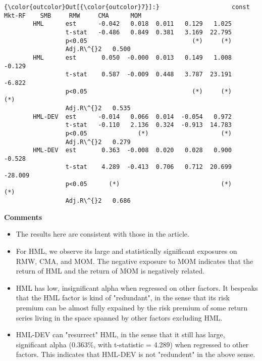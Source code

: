 \documentclass[11pt]{article}
\providecommand{\tightlist}{%
      \setlength{\itemsep}{0pt}\setlength{\parskip}{0pt}}
\begin{document}
            \begin{Verbatim}[commandchars=\\\{\}]
{\color{outcolor}Out[{\color{outcolor}7}]:}                    const  Mkt-RF    SMB     RMW     CMA      MOM
        HML      est      -0.042   0.018  0.011   0.129   1.025         
                 t-stat   -0.486   0.849  0.381   3.169  22.795         
                 p<0.05                             (*)     (*)         
                 Adj.R\^{}2   0.500                                        
        HML      est       0.050  -0.000  0.013   0.149   1.008   -0.129
                 t-stat    0.587  -0.009  0.448   3.787  23.191   -6.822
                 p<0.05                             (*)     (*)      (*)
                 Adj.R\^{}2   0.535                                        
        HML-DEV  est      -0.014   0.066  0.014  -0.054   0.972         
                 t-stat   -0.110   2.136  0.324  -0.913  14.783         
                 p<0.05              (*)                    (*)         
                 Adj.R\^{}2   0.279                                        
        HML-DEV  est       0.363  -0.008  0.020   0.028   0.900   -0.528
                 t-stat    4.289  -0.413  0.706   0.712  20.699  -28.009
                 p<0.05      (*)                            (*)      (*)
                 Adj.R\^{}2   0.686                                        
\end{Verbatim}
        
    \textbf{Comments}

\begin{itemize}
\tightlist
\item
  The results here are consistent with those in the article.
\item
  For HML, we observe its large and statistically significant exposures
  on RMW, CMA, and MOM. The negative exposure to MOM indicates that the
  return of HML and the return of MOM is negatively related.
\item
  HML has low, insignificant alpha when regressed on other factors. It
  bespeaks that the HML factor is kind of "redundant", in the sense that
  its risk premium can be almost fully expained by the risk premium of
  some return series living in the space spanned by other factors
  excluding HML.
\item
  HML-DEV can "resurrect" HML, in the sense that it still has large,
  significant alpha (0.363\%, with t-statistic = 4.289) when regressed
  to other factors. This indicates that HML-DEV is not "redundent" in
  the above sense.
\end{itemize}
\end{document}
